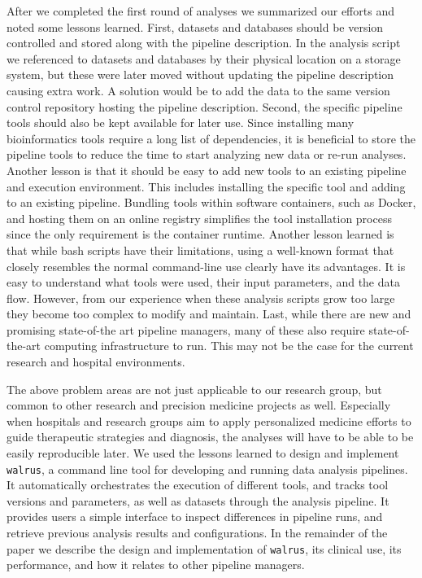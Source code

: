 After we completed the first round of analyses we summarized our efforts and
noted some lessons learned. 
First, datasets and databases should be version
controlled and stored along with the pipeline description. In the analysis
script we referenced to datasets and databases by their physical location on a
storage system, but these were later moved without updating the pipeline
description causing extra work. A solution would be to add the data to the same
version control repository hosting the pipeline description.
Second, the specific pipeline tools should also be kept available for later use.
Since installing many bioinformatics tools require a long list of dependencies,
it is beneficial to store the pipeline tools to reduce the time to start
analyzing new data or re-run analyses. 
Another lesson is that it should be easy to add new
tools to an existing pipeline and execution environment. This includes
installing the specific tool and adding to an existing pipeline. Bundling tools
within software containers, such as Docker, and hosting them on an online
registry simplifies the tool installation process since the only requirement is
the container runtime.
Another lesson learned is that while bash scripts have their limitations, using
a well-known format that closely resembles the normal command-line use clearly
have its advantages. It is easy to understand what tools were used, their input
parameters, and the data flow. However, from our experience when these analysis
scripts grow too large they become too complex to modify and maintain. 
Last, while there are new and promising state-of-the art pipeline managers, many
of these also require state-of-the-art computing infrastructure to run. This
may not be the case for the current research and hospital environments. 

The above problem areas are not just applicable to our research group, but
common to other research and precision medicine projects as well. Especially
when hospitals and research groups aim to apply personalized medicine efforts to
guide therapeutic strategies and diagnosis, the analyses will have to be able to
be easily reproducible later. We used the lessons learned to  design and
implement \texttt{walrus}, a command line tool for developing and running data
analysis pipelines. It automatically orchestrates the execution of different
tools, and tracks tool versions and parameters, as well as datasets through the
analysis pipeline. It provides users a simple interface to inspect differences
in pipeline runs, and retrieve previous analysis results and configurations. In
the remainder of the paper we describe the design and implementation of
\texttt{walrus}, its clinical use, its performance, and how it relates to other
pipeline managers. 


